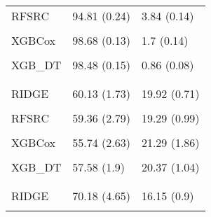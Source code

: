 \begin{longtable}[t]{lll}
\hspace{1em}RFSRC & 94.81 (0.24) & 3.84 (0.14)\\
\hspace{1em}\cellcolor{gray!10}{RFSRC\_DT} & \cellcolor{gray!10}{97.49 (0.34)} & \cellcolor{gray!10}{1.01 (0.14)}\\
\hspace{1em}XGBCox & 98.68 (0.13) & 1.7 (0.14)\\
\hspace{1em}\cellcolor{gray!10}{XGB\_PEM} & \cellcolor{gray!10}{97.2 (0.41)} & \cellcolor{gray!10}{0.92 (0.09)}\\
\hspace{1em}XGB\_DT & 98.48 (0.15) & 0.86 (0.08)\\
\addlinespace[0.3em]
\multicolumn{3}{l}{\textbf{std}}\\
\hspace{1em}\cellcolor{gray!10}{KM} & \cellcolor{gray!10}{50 (0)} & \cellcolor{gray!10}{19.92 (0.71)}\\
\hspace{1em}RIDGE & 60.13 (1.73) & 19.92 (0.71)\\
\hspace{1em}\cellcolor{gray!10}{GLMN} & \cellcolor{gray!10}{50 (0)} & \cellcolor{gray!10}{19.92 (0.71)}\\
\hspace{1em}RFSRC & 59.36 (2.79) & 19.29 (0.99)\\
\hspace{1em}\cellcolor{gray!10}{RFSRC\_DT} & \cellcolor{gray!10}{58.19 (1.84)} & \cellcolor{gray!10}{19.69 (0.78)}\\
\hspace{1em}XGBCox & 55.74 (2.63) & 21.29 (1.86)\\
\hspace{1em}\cellcolor{gray!10}{XGB\_PEM} & \cellcolor{gray!10}{57.11 (2.9)} & \cellcolor{gray!10}{19.71 (1.09)}\\
\hspace{1em}XGB\_DT & 57.58 (1.9) & 20.37 (1.04)\\
\addlinespace[0.3em]
\multicolumn{3}{l}{\textbf{mgus}}\\
\hspace{1em}\cellcolor{gray!10}{KM} & \cellcolor{gray!10}{50 (0)} & \cellcolor{gray!10}{19.01 (0.52)}\\
\hspace{1em}RIDGE & 70.18 (4.65) & 16.15 (0.9)\\
\hspace{1em}\cellcolor{gray!10}{GLMN} & \cellcolor{gray!10}{69.65 (3.58)} & \cellcolor{gray!10}{16.34 (0.81)}\\

\end{longtable}
